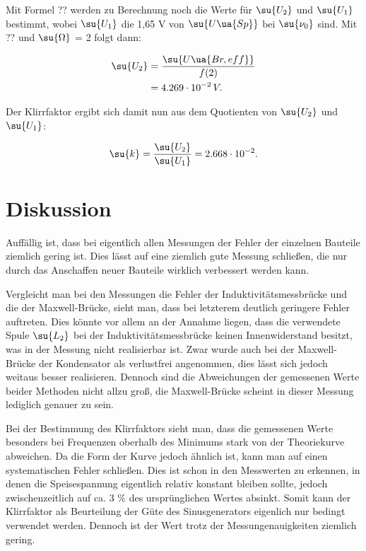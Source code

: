 Mit Formel ?? werden zu Berechnung noch die Werte für $\su{U_2}$ und $\su{U_1}$ bestimmt,
wobei $\su{U_1}$ die 1,65 V von $\su{U\ua{Sp}}$ bei $\su{\nu_0}$ sind. Mit ?? und
 $\su{\Omega}$ = 2 folgt dann:

\begin{align}
  \su{U_2} &= \frac{\su{U\ua{Br,eff}}}{f(2)} \\
           &= 4.269 \cdot 10^{-2} \, V.
\end{align}

Der Klirrfaktor ergibt sich damit nun aus dem Quotienten von $\su{U_2}$ und
$\su{U_1}$:

\begin{equation}
  \su{k} = \frac{\su{U_2}}{\su{U_1}} = 2.668 \cdot 10^{-2}.
\end{equation}

\newpage


\section{Diskussion}

Auffällig ist, dass bei eigentlich allen Messungen der Fehler der einzelnen
Bauteile ziemlich gering ist. Dies lässt auf eine ziemlich gute Messung schließen,
die nur durch das Anschaffen neuer Bauteile wirklich verbessert werden kann.

Vergleicht man bei den Messungen die Fehler der Induktivitätsmessbrücke und die
der Maxwell-Brücke, sieht man, dass bei letzterem deutlich geringere Fehler
auftreten. Dies könnte vor allem an der Annahme liegen, dass die verwendete
Spule $\su{L_2}$ bei der Induktivitätsmessbrücke keinen Innenwiderstand besitzt,
was in der Messung nicht realisierbar ist.
Zwar wurde auch bei der Maxwell-Brücke der Kondensator als verlustfrei angenommen,
dies lässt sich jedoch weitaus besser realisieren. Dennoch sind die Abweichungen
der gemessenen Werte beider Methoden nicht allzu groß, die Maxwell-Brücke
scheint in dieser Messung lediglich genauer zu sein.

Bei der Bestimmung des Klirrfaktors sieht man, dass die gemessenen Werte besonders
bei Frequenzen oberhalb des Minimums stark von der Theoriekurve abweichen. Da die
Form der Kurve jedoch ähnlich ist, kann man auf einen systematischen Fehler schließen.
Dies ist schon in den Messwerten zu erkennen, in denen die Speisespannung eigentlich
relativ konstant bleiben sollte, jedoch zwischenzeitlich auf ca. 3 $\%$ des
ursprünglichen Wertes absinkt. Somit kann der Klirrfaktor als Beurteilung der
Güte des Sinusgenerators eigenlich nur bedingt verwendet werden. Dennoch ist
der Wert trotz der Messungenauigkeiten ziemlich gering.




